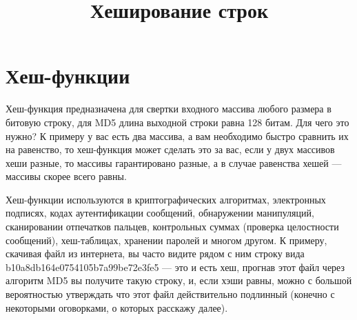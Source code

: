 \documentclass[a4paper, 12pt, oneside]{scrartcl}
\title{Хеширование строк}
\author{}
\date{}
\begin{document}
	\maketitle
	\section{Хеш-функции}\label{sec:section1}
	Хеш-функция предназначена для свертки входного массива любого размера в битовую строку, для MD5 длина выходной строки равна 128 битам. Для чего это нужно?
	К примеру у вас есть два массива, а вам необходимо быстро сравнить их на равенство, то хеш-функция может сделать это за вас, если у двух массивов хеши разные, то массивы гарантировано разные, а в случае равенства хешей — массивы скорее всего равны.
	
	Хеш-функции используются в криптографических алгоритмах, электронных подписях, кодах аутентификации сообщений, обнаружении манипуляций, сканировании отпечатков пальцев, контрольных суммах (проверка целостности сообщений), хеш-таблицах, хранении паролей и многом другом. К примеру, скачивая файл из интернета, вы часто видите рядом с ним строку вида b10a8db164e0754105b7a99be72e3fe5 — это и есть хеш, прогнав этот файл через алгоритм MD5 вы получите такую строку, и, если хэши равны, можно с большой вероятностью утверждать что этот файл действительно подлинный (конечно с некоторыми оговорками, о которых расскажу далее).~\cite{managementsystem}
	
\end{document}
